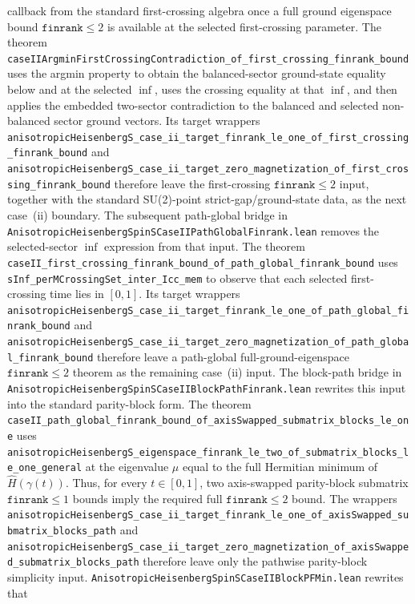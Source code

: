 \documentclass[a4paper,11pt]{article}
\begin{document}
callback from the standard first-crossing algebra once a full ground
eigenspace bound \(\texttt{finrank}\le2\) is available at the selected
first-crossing parameter.  The theorem
\texttt{caseIIArgminFirstCrossingContradiction\_of\_first\_crossing\_finrank\_bound}
uses the argmin property to obtain the balanced-sector ground-state equality
below and at the selected \(\inf\), uses the crossing equality at that
\(\inf\), and then applies the embedded two-sector contradiction to the
balanced and selected non-balanced sector ground vectors.  Its target wrappers
\texttt{anisotropicHeisenbergS\_case\_ii\_target\_finrank\_le\_one\_of\_first\_crossing\_finrank\_bound}
and
\texttt{anisotropicHeisenbergS\_case\_ii\_target\_zero\_magnetization\_of\_first\_crossing\_finrank\_bound}
therefore leave the first-crossing \(\texttt{finrank}\le2\) input, together
with the standard SU(2)-point strict-gap/ground-state data, as the next
case~(ii) boundary.  The subsequent path-global bridge in
\texttt{AnisotropicHeisenbergSpinSCaseIIPathGlobalFinrank.lean} removes the
selected-sector \(\inf\) expression from that input.  The theorem
\texttt{caseII\_first\_crossing\_finrank\_bound\_of\_path\_global\_finrank\_bound}
uses
\texttt{sInf\_perMCrossingSet\_inter\_Icc\_mem} to observe that each selected
first-crossing time lies in \([0,1]\).  Its target wrappers
\texttt{anisotropicHeisenbergS\_case\_ii\_target\_finrank\_le\_one\_of\_path\_global\_finrank\_bound}
and
\texttt{anisotropicHeisenbergS\_case\_ii\_target\_zero\_magnetization\_of\_path\_global\_finrank\_bound}
therefore leave a path-global full-ground-eigenspace
\(\texttt{finrank}\le2\) theorem as the remaining case~(ii) input.
The block-path bridge in
\texttt{AnisotropicHeisenbergSpinSCaseIIBlockPathFinrank.lean} rewrites this
input into the standard parity-block form.  The theorem
\texttt{caseII\_path\_global\_finrank\_bound\_of\_axisSwapped\_submatrix\_blocks\_le\_one}
uses
\texttt{anisotropicHeisenbergS\_eigenspace\_finrank\_le\_two\_of\_submatrix\_blocks\_le\_one\_general}
at the eigenvalue \(\mu\) equal to the full Hermitian minimum of
\(\hat H(\gamma(t))\).  Thus, for every \(t\in[0,1]\), two axis-swapped
parity-block submatrix \(\texttt{finrank}\le1\) bounds imply the required
full \(\texttt{finrank}\le2\) bound.  The wrappers
\texttt{anisotropicHeisenbergS\_case\_ii\_target\_finrank\_le\_one\_of\_axisSwapped\_submatrix\_blocks\_path}
and
\texttt{anisotropicHeisenbergS\_case\_ii\_target\_zero\_magnetization\_of\_axisSwapped\_submatrix\_blocks\_path}
therefore leave only the pathwise parity-block simplicity input.
\texttt{AnisotropicHeisenbergSpinSCaseIIBlockPFMin.lean} rewrites that
\end{document}
